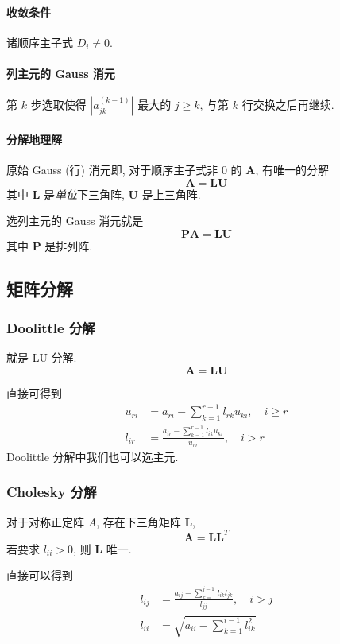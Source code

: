\documentclass{ctexart}
\begin{document}
\paragraph{收敛条件}
    诸顺序主子式 $D_i \neq 0$.\par
\paragraph{列主元的 Gauss 消元}
    第 $k$ 步选取使得 $|a^{(k-1)}_{jk}|$ 最大的 $j \ge k$, 与第 $k$ 行交换之后再继续.
\paragraph{分解地理解}
    原始 Gauss (行) 消元即, 对于顺序主子式非 0 的 $\mathbf{A}$, 有唯一的分解 \[
        \mathbf{A} = \mathbf{L} \mathbf{U}\]
    其中 $\mathbf{L}$ 是\emph{单位}下三角阵, $\mathbf{U}$ 是上三角阵.\par
    选列主元的 Gauss 消元就是 \[
        \mathbf{P} \mathbf{A} = \mathbf{L} \mathbf{U}\]
    其中 $\mathbf{P}$ 是排列阵.

\subsection{矩阵分解}
\subsubsection{Doolittle 分解}
    就是 LU 分解. \[
        \mathbf{A} = \mathbf{L} \mathbf{U}
    \]
    \par
    直接可得到 \begin{align*}
        u_{ri} &= a_{ri} - \sum_{k=1}^{r-1} l_{rk} u_{ki},\quad i \ge r\\
        l_{ir} &= \frac{a_{ir} - \sum_{k=1}^{r-1} l_{ik} u_{kr}}{u_{rr}},\quad i > r
    \end{align*}
    Doolittle 分解中我们也可以选主元.
\subsubsection{Cholesky 分解}
    对于对称正定阵 $A$, 存在下三角矩阵 $\mathbf{L}$, \[
        \mathbf{A} = \mathbf{L} \mathbf{L}^T\]
    若要求 $l_{ii} > 0$, 则 $\mathbf{L}$ 唯一.\par
    直接可以得到 \begin{align*}
        l_{ij} &= \frac{a_{ij} - \sum_{k=1}^{j-1} l_{ik} l_{jk}}{l_{jj}},\quad i > j\\
        l_{ii} &= \sqrt{a_{ii} - \sum_{k=1}^{i-1} l_{ik}^2}
    \end{align*}
\end{document}
